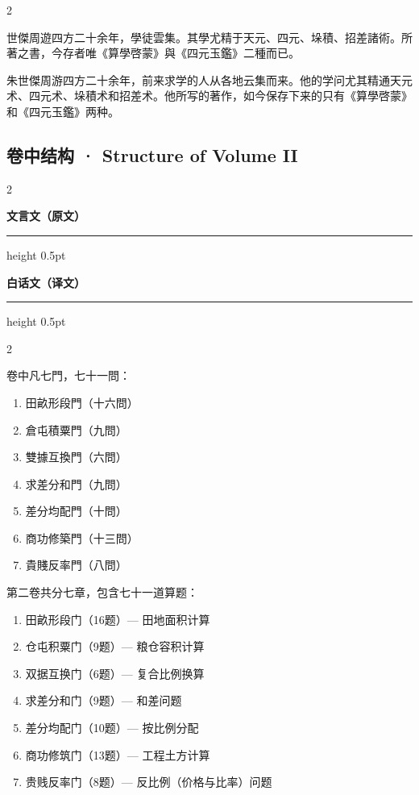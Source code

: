 \documentclass[11pt,a4paper]{article}
\newcommand{\classicalheader}{%
  \begin{center}
  \textbf{\textcolor{headerclassical}{\large 文言文（原文）}}
  \end{center}
  \vspace{-0.3em}
  \hrule height 0.5pt \color{classicalborder}
  \vspace{0.5em}
}
\newcommand{\modernheader}{%
  \begin{center}
  \textbf{\textcolor{headermodern}{\large 白话文（译文）}}
  \end{center}
  \vspace{-0.3em}
  \hrule height 0.5pt \color{modernborder}
  \vspace{0.5em}
}
\begin{document}
\vspace{0.5em}

\begin{paracol}{2}
\begin{leftcolumn}
世傑周遊四方二十余年，學徒雲集。其學尤精于天元、四元、垛積、招差諸術。所著之書，今存者唯《算學啓蒙》與《四元玉鑑》二種而已。
\end{leftcolumn}
\begin{rightcolumn}
朱世傑周游四方二十余年，前来求学的人从各地云集而来。他的学问尤其精通天元术、四元术、垛積术和招差术。他所写的著作，如今保存下来的只有《算學啓蒙》和《四元玉鑑》两种。
\end{rightcolumn}
\end{paracol}

\subsection{卷中结构 · Structure of Volume II}

\begin{paracol}{2}
\begin{leftcolumn}
\classicalheader
\end{leftcolumn}
\begin{rightcolumn}
\modernheader
\end{rightcolumn}
\end{paracol}

\begin{paracol}{2}
\begin{leftcolumn}
卷中凡七門，七十一問：
\begin{enumerate}[noitemsep]
\item 田畝形段門（十六問）
\item 倉屯積粟門（九問）
\item 雙據互換門（六問）
\item 求差分和門（九問）
\item 差分均配門（十問）
\item 商功修築門（十三問）
\item 貴賤反率門（八問）
\end{enumerate}
\end{leftcolumn}
\begin{rightcolumn}
第二卷共分七章，包含七十一道算题：
\begin{enumerate}[noitemsep]
\item 田畝形段门（16题）--- 田地面积计算
\item 仓屯积粟门（9题）--- 粮仓容积计算
\item 双据互换门（6题）--- 复合比例换算
\item 求差分和门（9题）--- 和差问题
\item 差分均配门（10题）--- 按比例分配
\item 商功修筑门（13题）--- 工程土方计算
\item 贵贱反率门（8题）--- 反比例（价格与比率）问题
\end{enumerate}
\end{rightcolumn}
\end{paracol}
\end{document}
